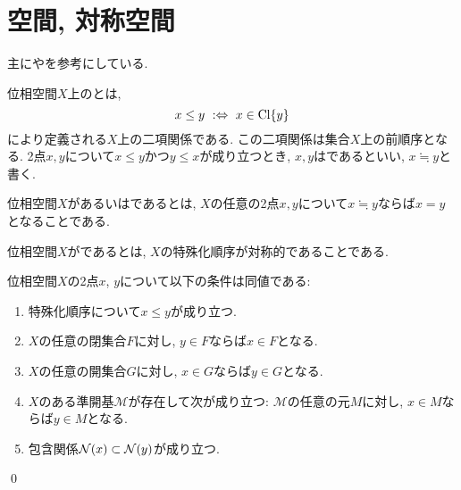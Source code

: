 \documentclass[uplatex, dvipdfmx, a4paper, 12pt, class=jsbook, crop=false]{standalone}
\begin{document}
\section{空間, 対称空間}
\label{sec:T0-spaces}

\newcommand{\topleq}{\leq}
\newcommand{\topindis}{\fallingdotseq}

\begin{source}
	主に\cite[Chapter 16]{Schechter1997HAF}や\cite[Section 4.2]{GoubaultLarrecq2013NH}を参考にしている.
\end{source}

\begin{definition}
	位相空間$X$上のとは,
	\[ x \topleq y \defarw x \in \topcl \{y\} \]
	により定義される$X$上の二項関係である.
	この二項関係は集合$X$上の前順序となる.
	2点$x, y$について$x \leq y$かつ$y \leq x$が成り立つとき,
	$x, y$はであるといい,
	$x \topindis y$と書く.
\end{definition}

\begin{definition}
	位相空間$X$があるいはであるとは,
	$X$の任意の2点$x, y$について$x \topindis y$ならば$x = y$となることである.
\end{definition}

\begin{definition}
	位相空間$X$がであるとは, $X$の特殊化順序が対称的であることである.
\end{definition}

\begin{proposition}
	\label{05a202}
	\newcommand{\cM}{\mathcal{M}}
	位相空間$X$の2点$x$, $y$について以下の条件は同値である:
	\begin{enumerate}
		\item 特殊化順序について$x \leq y$が成り立つ.
		\item $X$の任意の閉集合$F$に対し, $y \in F$ならば$x \in F$となる.
		\item $X$の任意の開集合$G$に対し, $x \in G$ならば$y \in G$となる.
		\item $X$のある準開基$\cM$が存在して次が成り立つ: $\cM$の任意の元$M$に対し, $x \in M$ならば$y \in M$となる.
		\item 包含関係$\topnbd{x} \subset \topnbd{y}$が成り立つ.
	\end{enumerate}
	\qed
\end{proposition}
\end{document}
